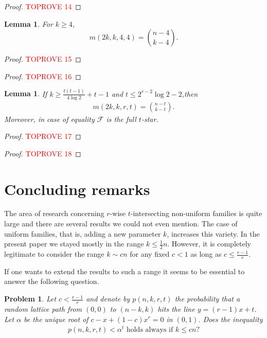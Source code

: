 \documentclass[11pt,a4paper]{article}
\newtheorem{prob}[thm]{Problem}
\newtheorem{lem}[thm]{Lemma}
\newtheorem{false statement}{False statement}
\theoremstyle{definition}
\def\hf{\mathcal{F}}
\begin{document}
\begin{proof}\textcolor{red}{TOPROVE 14}\end{proof}

\begin{lem}\label{lem-6.6}
For $k\geq 4$,
\[
m(2k,k,4,4)=\binom{n-4}{k-4}.
\]
\end{lem}

\begin{proof}\textcolor{red}{TOPROVE 15}\end{proof}

\begin{proof}\textcolor{red}{TOPROVE 16}\end{proof}


\begin{lem}\label{lem-6.3}
 If $k\geq  \frac{t(t-1)}{4\log 2} +t-1$ and  $t\leq 2^{r-2}\log 2 -2$,then
\begin{align}\label{ineq-5.3}
m(2k,k,r,t) =\binom{n-t}{k-t}.
\end{align}
Moreover, in case of equality $\hf$ is the full $t$-star.
\end{lem}
\begin{proof}\textcolor{red}{TOPROVE 17}\end{proof}



\begin{proof}\textcolor{red}{TOPROVE 18}\end{proof}

\section{Concluding remarks}


The area of research concerning $r$-wise $t$-intersecting non-uniform families is quite large and there are several results we could not even mention. The case of uniform families, that is, adding a new parameter $k$, increases this variety. In the present paper we stayed mostly in the range $k\leq \frac{1}{2}n$. However, it is completely legitimate to consider the range $k\sim cn$ for any fixed $c<1$ as long as $c\leq \frac{r-1}{r}$.

If one wants to extend the results to such a range it seems to be essential to answer the following question.

\begin{prob}
Let $c<\frac{r-1}{r}$ and denote by $p(n,k,r,t)$ the probability that a random lattice path from $(0,0)$ to $(n-k,k)$ hits the line $y=(r-1)x+t$. Let $\alpha$ be the unique root of $c-x+(1-c)x^r=0$ in $(0,1)$. Does the inequality
\begin{align}
p(n,k,r,t) <\alpha^t \mbox{ holds always if }k\leq cn?
\end{align}
\end{prob}
\end{document}
